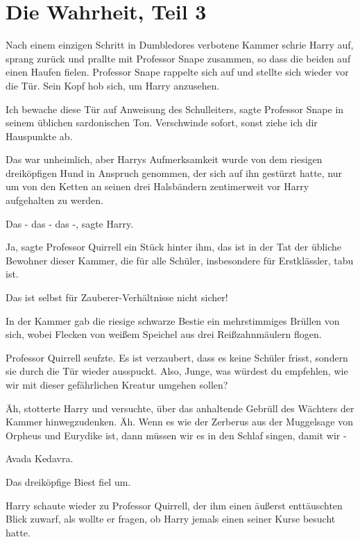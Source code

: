 \chapter{Die Wahrheit, Teil 3}

Nach einem einzigen Schritt in Dumbledores verbotene Kammer schrie Harry auf,
sprang zurück und prallte mit Professor Snape zusammen, so dass die beiden auf
einen Haufen fielen. Professor Snape rappelte sich auf und stellte sich wieder
vor die Tür. Sein Kopf hob sich, um Harry anzusehen.

\glqq{}Ich bewache diese Tür auf Anweisung des Schulleiters\grqq{}, sagte
Professor Snape in seinem üblichen sardonischen Ton. \glqq{}Verschwinde sofort,
sonst ziehe ich dir Hauspunkte ab.\grqq{}

Das war unheimlich, aber Harrys Aufmerksamkeit wurde von dem riesigen
dreiköpfigen Hund in Anspruch genommen, der sich auf ihn gestürzt hatte, nur um
von den Ketten an seinen drei Halsbändern zentimerweit vor Harry aufgehalten zu
werden.

\glqq{}Das - das - das -\grqq{}, sagte Harry.

\glqq{}Ja\grqq{}, sagte Professor Quirrell ein Stück hinter ihm, \glqq{}das ist in
der Tat der übliche Bewohner dieser Kammer, die für alle Schüler, insbesondere
für Erstklässler, tabu ist.\grqq{}

\glqq{}Das ist selbst für Zauberer-Verhältnisse nicht sicher!\grqq{}

In der Kammer gab die riesige schwarze Bestie ein mehrstimmiges Brüllen von
sich, wobei Flecken von weißem Speichel aus drei Reißzahnmäulern flogen.

Professor Quirrell seufzte. \glqq{}Es ist verzaubert, dass es keine Schüler
frisst, sondern sie durch die Tür wieder ausspuckt. Also, Junge, was würdest du
empfehlen, wie wir mit dieser gefährlichen Kreatur umgehen sollen?\grqq{}

\glqq{}Äh\grqq{}, stotterte Harry und versuchte, über das anhaltende Gebrüll des
Wächters der Kammer hinwegzudenken. \glqq{}Äh. Wenn es wie der Zerberus aus der
Muggelsage von Orpheus und Eurydike ist, dann müssen wir es in den Schlaf
singen, damit wir -\grqq{}

\glqq{}Avada Kedavra.\grqq{}

Das dreiköpfige Biest fiel um.

Harry schaute wieder zu Professor Quirrell, der ihm einen äußerst enttäuschten
Blick zuwarf, als wollte er fragen, ob Harry jemals einen seiner Kurse besucht
hatte.

